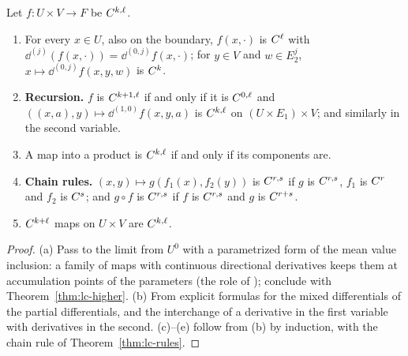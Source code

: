 \begin{theorem}
  \label{thm:lc-ckl}
  \leanok
  Let $f \colon U \times V \to F$ be $C^{k,\ell}$.
  \begin{enumerate}
    \item For every $x \in U$, also on the boundary, $f(x, \cdot)$ is $C^{\ell}$ with
      $\dd^{(j)}(f(x, \cdot)) = \dd^{(0,j)} f(x, \cdot)$; for $y \in V$ and $w \in E_2^j$,
      $x \mapsto \dd^{(0,j)} f(x, y, w)$ is $C^{k}$.
    \item \textbf{Recursion.} $f$ is $C^{k+1,\ell}$ if and only if it is $C^{0,\ell}$ and
      $((x, a), y) \mapsto \dd^{(1,0)} f(x, y, a)$ is $C^{k,\ell}$ on
      $(U \times E_1) \times V$; and
      similarly in the second variable.
    \item A map into a product is $C^{k,\ell}$ if and only if its components are.
    \item \textbf{Chain rules.} $(x, y) \mapsto g(f_1(x), f_2(y))$ is $C^{r,s}$ if $g$ is
      $C^{r,s}$, $f_1$ is $C^{r}$ and $f_2$ is $C^{s}$; and $g \circ f$ is $C^{r,s}$ if $f$ is
      $C^{r,s}$ and $g$ is $C^{r+s}$.
    \item $C^{k+\ell}$ maps on $U \times V$ are $C^{k,\ell}$.
  \end{enumerate}
\end{theorem}

\begin{proof}
  \leanok
  (a) Pass to the limit from $U^0$ with a parametrized form of the mean value inclusion: a family
  of maps with continuous directional derivatives keeps them at accumulation points of the
  parameters (the role of \cite[Lemma~1.4.18]{GN26}); conclude with Theorem~\ref{thm:lc-higher}.
  (b) From explicit formulas for the mixed differentials of the partial differentials, and the
  interchange of a derivative in the first variable with derivatives in the second. (c)--(e)
  follow from (b) by induction, with the chain rule of Theorem~\ref{thm:lc-rules}.
\end{proof}

